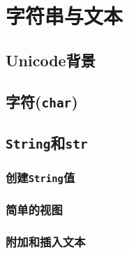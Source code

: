 \chapter{字符串与文本}\label{ch17}

\section{Unicode背景}

\section{字符(\texttt{char})}

\section{\texttt{String}和\texttt{str}}

\subsection{创建\texttt{String}值}

\subsection{简单的视图}

\subsection{附加和插入文本}\label{AppendText}